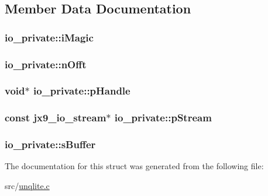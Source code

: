 \subsection{Member Data Documentation}
\hypertarget{structio__private_ad010e0df353e4221a9ac0ead92dc3248}{
\subsubsection[{i\-Magic}]{ io\-\_\-private\-::i\-Magic}}\label{dd/d91/structio__private_ad010e0df353e4221a9ac0ead92dc3248}
\hypertarget{structio__private_a72f4b562f689d80b79b57a4619aa1d2a}{
\subsubsection[{n\-Offt}]{ io\-\_\-private\-::n\-Offt}}\label{dd/d91/structio__private_a72f4b562f689d80b79b57a4619aa1d2a}
\hypertarget{structio__private_a135407c2360b7481b7e6a65eb02fd3f8}{
\subsubsection[{p\-Handle}]{\setlength{\rightskip}{0pt plus 5cm}void$\ast$ io\-\_\-private\-::p\-Handle}}\label{dd/d91/structio__private_a135407c2360b7481b7e6a65eb02fd3f8}
\hypertarget{structio__private_a2adc55c0db481478837c2dc76c62e65f}{
\subsubsection[{p\-Stream}]{\setlength{\rightskip}{0pt plus 5cm}const {\bf jx9\-\_\-io\-\_\-stream}$\ast$ io\-\_\-private\-::p\-Stream}}\label{dd/d91/structio__private_a2adc55c0db481478837c2dc76c62e65f}
\hypertarget{structio__private_a0f6cb2ecb35fd7a26c41b4f170ed9137}{
\subsubsection[{s\-Buffer}]{ io\-\_\-private\-::s\-Buffer}}\label{dd/d91/structio__private_a0f6cb2ecb35fd7a26c41b4f170ed9137}


The documentation for this struct was generated from the following file\-:\begin{DoxyCompactItemize}
\item 
src/\hyperlink{unqlite_8c}{unqlite.\-c}\end{DoxyCompactItemize}
